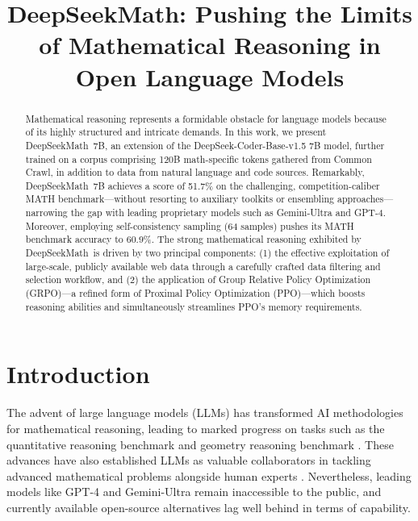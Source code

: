 \title{DeepSeekMath: Pushing the Limits of Mathematical Reasoning in Open Language Models}

\begin{abstract}
Mathematical reasoning represents a formidable obstacle for language models because of its highly structured and intricate demands. In this work, we present DeepSeekMath~7B, an extension of the DeepSeek-Coder-Base-v1.5 7B model, further trained on a corpus comprising 120B math-specific tokens gathered from Common Crawl, in addition to data from natural language and code sources. Remarkably, DeepSeekMath~7B achieves a score of 51.7\% on the challenging, competition-caliber MATH benchmark—without resorting to auxiliary toolkits or ensembling approaches—narrowing the gap with leading proprietary models such as Gemini-Ultra and GPT-4. Moreover, employing self-consistency sampling (64 samples) pushes its MATH benchmark accuracy to 60.9\%. The strong mathematical reasoning exhibited by DeepSeekMath~is driven by two principal components: (1) the effective exploitation of large-scale, publicly available web data through a carefully crafted data filtering and selection workflow, and (2) the application of Group Relative Policy Optimization (GRPO)—a refined form of Proximal Policy Optimization (PPO)—which boosts reasoning abilities and simultaneously streamlines PPO's memory requirements.
\end{abstract}

\section{Introduction}

The advent of large language models (LLMs) has transformed AI methodologies for mathematical reasoning, leading to marked progress on tasks such as the quantitative reasoning benchmark \citep{MATH} and geometry reasoning benchmark \citep{trinh2024solving}. These advances have also established LLMs as valuable collaborators in tackling advanced mathematical problems alongside human experts \citep{tao}. Nevertheless, leading models like GPT-4 \citep{gpt4} and Gemini-Ultra \citep{gemini} remain inaccessible to the public, and currently available open-source alternatives lag well behind in terms of capability.


